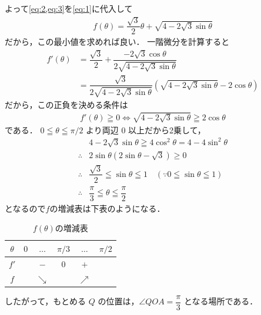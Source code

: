 \documentclass[../../main.tex]{subfiles}
\begin{document}
よって\cref{eq:2,eq:3}を\cref{eq:1}に代入して
\begin{align}
  f(\theta) = \dfrac{\sqrt{3}}{2} \theta + \sqrt{4 - 2\sqrt{3} \sin\theta}
\end{align}
だから，この最小値を求めれば良い．
一階微分を計算すると
\begin{align}
  f'(\theta)
  &= \dfrac{\sqrt{3}}{2} + \dfrac{-2\sqrt{3}\cos\theta}{2\sqrt{4 - 2\sqrt{3}\sin\theta}} \\
  &= \dfrac{\sqrt{3}}{2\sqrt{4 - 2\sqrt{3}\sin\theta}}\left(\sqrt{4 - 2\sqrt{3}\sin\theta} -2\cos\theta \right)
\end{align}
だから，この正負を決める条件は
\begin{align}
  f'(\theta) \geqq 0 \iff \sqrt{4 - 2\sqrt{3} \sin\theta} \geqq 2 \cos\theta
\end{align}
である．
$0 \leqq \theta \leqq \pi/2$ より両辺 $0$ 以上だから2乗して，
\begin{align}
  & 4 - 2\sqrt{3} \sin\theta \geqq 4 \cos^2\theta = 4 - 4 \sin^2\theta \\
  \therefore
  & 2\sin\theta\left(2\sin\theta-\sqrt{3}\right) \ge 0 \\
  \therefore
  & \dfrac{\sqrt{3}}{2} \leqq \sin\theta \leqq 1 \quad (\because 0 \leqq \sin\theta \leqq 1) \\
  \therefore
  & \dfrac{\pi}{3} \leqq \theta \leqq \dfrac{\pi}{2}
\end{align}
となるので$f$の増減表は下表のようになる．

\begin{table}[htb]
  \begin{center}
    \caption{$f(\theta)$の増減表}
    \begin{tabular}{c|ccccc}
      $\theta$ & $0$ & $\dots$ & $\pi/3$ & $\dots$ & $\pi/2$ \\ \hline
      $f'$ & & $-$ & $0$ & $+$ & \\ \hline
      $f$ & & $\searrow$ & & $\nearrow$ &
    \end{tabular}
  \end{center}
\end{table}

したがって，もとめる $Q$ の位置は，$\angle QOA = \dfrac{\pi}{3}$ となる場所である．
\end{document}
